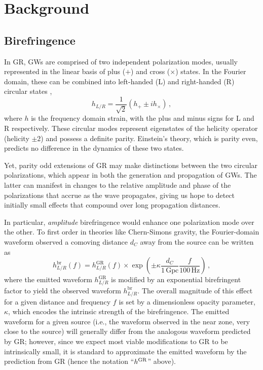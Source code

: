 \documentclass[aps,prd,twocolumn,superscriptaddress,preprintnumbers,floatfix,nofootinbib]{revtex4-2}
\begin{document}
\section{Background}
\label{sec:Background}

\subsection{Birefringence}
\label{sec:waveform}

In \ac{GR}, \acp{GW} are comprised of two independent polarization modes, usually represented in the linear basis of plus ($+$) and cross ($\times$) states.
In the Fourier domain, these can be combined into left-handed (L) and right-handed (R) circular states \cite{Isi:2022mbx},
\begin{equation}
    h_{L/R} = \frac{1}{\sqrt{2}}\left(h_+ \pm i h_\times\right)\,,
\end{equation}
where $h$ is the frequency domain strain, with the plus and minus signs for L and R respectively.
These circular modes represent eigenstates of the helicity operator (helicity $\pm2$) and possess a definite parity.
Einstein's theory, which is parity even, predicts no difference in the dynamics of these two states.

Yet, parity odd extensions of \ac{GR} may make distinctions between the two circular polarizations, which appear in both the generation and propagation of \acp{GW}.
The latter can manifest in changes to the relative amplitude and phase of the polarizations that accrue as the wave propagates, giving us hope to detect initially small effects that compound over long propagation distances.

In particular, \emph{amplitude} birefringence would enhance one polarization mode over the other.
To first order in theories like Chern-Simons gravity, the Fourier-domain waveform observed a comoving distance $d_C$ away from the source can be written as
\begin{equation}
    h_{L/R}^{\mathrm{br}}(f) =
    h_{L/R}^{\mathrm{GR}}(f) \times
    \exp\left(\pm\kappa\frac{d_C}{1\, \mathrm{Gpc}}\frac{f}{100\,\mathrm{Hz}}\right)\,,
    \label{eq:waveform_modification}
\end{equation}
where the emitted waveform $h_{L/R}^{\mathrm{GR}}$ is modified by an exponential birefringent factor to yield the observed waveform $h_{L/R}^{\mathrm{br}}$.
The overall magnitude of this effect for a given distance and frequency $f$ is set by a dimensionless opacity parameter, $\kappa$, which encodes the intrinsic strength of the birefringence.
The emitted waveform for a given source (i.e., the waveform observed in the near zone, very close to the source) will generally differ from the analogous waveform predicted by \ac{GR}; however, since we expect most viable modifications to \ac{GR} to be intrinsically small, it is standard to approximate the emitted waveform by the prediction from \ac{GR} (hence the notation ``$h^{\rm GR}$'' above).
\end{document}
